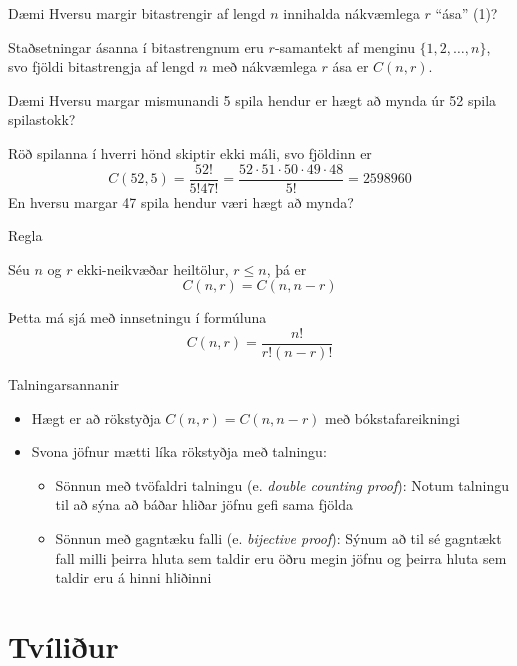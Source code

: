 \documentclass[handout]{beamer}
\begin{document}
\begin{frame}{Dæmi}
Hversu margir bitastrengir af lengd $n$ innihalda nákvæmlega $r$ ``ása'' (1)? \pause

Staðsetningar ásanna í bitastrengnum eru $r$-samantekt af menginu $\{1,2,\ldots,n\}$, svo fjöldi bitastrengja af lengd $n$ með nákvæmlega $r$ ása er $C(n, r)$.
\end{frame}

\begin{frame}{Dæmi}
Hversu margar mismunandi 5 spila hendur er hægt að mynda úr 52 spila spilastokk? \pause

Röð spilanna í hverri hönd skiptir ekki máli, svo fjöldinn er
\[
 C(52,5) = \frac{52!}{5!47!} = \frac{52\cdot51\cdot50\cdot49\cdot48}{5!} = 2598960
\]
\pause
En hversu margar 47 spila hendur væri hægt að mynda?
\end{frame}

\begin{frame}{Regla}
    \begin{tcolorbox}
        Séu $n$ og $r$ ekki-neikvæðar heiltölur, $r \leq n$, þá er
        \[
            C(n,r) = C(n,n-r)
        \]
    \end{tcolorbox}
Þetta má sjá með innsetningu í formúluna 
\[
 C(n,r) = \frac{n!}{r!(n-r)!}
\]
\end{frame}

\begin{frame}{Talningarsannanir}
\begin{itemize}
    \item Hægt er að rökstyðja $C(n,r) = C(n,n-r)$ með bókstafareikningi
    \item Svona jöfnur mætti líka rökstyðja með talningu:
    \begin{itemize}
        \item Sönnun með tvöfaldri talningu (e. \emph{double counting proof}): Notum talningu til að sýna að báðar hliðar jöfnu gefi sama fjölda
        \item Sönnun með gagntæku falli (e. \emph{bijective proof}): Sýnum að til sé gagntækt fall milli þeirra hluta sem taldir eru öðru megin jöfnu og þeirra hluta sem taldir eru á hinni hliðinni
    \end{itemize}
\end{itemize}
\end{frame}

\section{Tvíliður}
\end{document}

